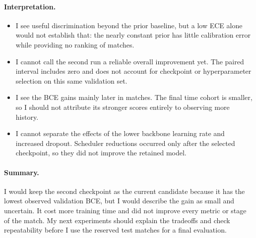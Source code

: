 \documentclass[11pt]{article}
\begin{document}
    \begin{samepage}
    \paragraph{Interpretation.}
    \begin{itemize}
        \item I see useful discrimination beyond the prior baseline, but a low
        ECE alone would not establish that: the nearly constant prior has little
        calibration error while providing no ranking of matches.
        \item I cannot call the second run a reliable overall improvement yet.
        The paired interval includes zero and does not account for checkpoint
        or hyperparameter selection on this same validation set.
        \item I see the BCE gains mainly later in matches. The final time cohort
        is smaller, so I should not attribute its stronger scores entirely to
        observing more history.
        \item I cannot separate the effects of the lower backbone learning rate
        and increased dropout. Scheduler reductions occurred only after
        the selected checkpoint, so they did not improve
        the retained model.
    \end{itemize}
    \end{samepage}

    \paragraph{Summary.}
    I would keep the second checkpoint as the current candidate because it has
    the lowest observed validation BCE, but I would describe the gain as small
    and uncertain. It cost more training time and did not improve every metric
    or stage of the match. My next experiments should explain the tradeoffs and
    check repeatability before I use the reserved test matches for a final evaluation.
\end{document}
